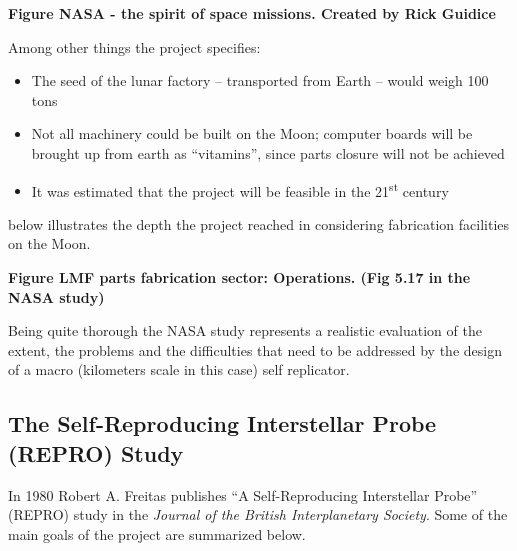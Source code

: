 \documentclass[letterpaper]{article}
\begin{document}
\bigskip

{\bfseries
\label{bkm:Ref330929827}Figure  NASA - the spirit of space missions.
Created by Rick Guidice}


\bigskip

Among other things the project specifies:


\bigskip

\begin{itemize}
\item The seed of the lunar factory – transported from Earth – would
weigh 100 tons
\item Not all machinery could be built on the Moon; computer boards will
be brought up from earth as “vitamins”, since parts closure will not be
achieved
\item It was estimated that the project will be feasible in the
21\textsuperscript{st} century
\end{itemize}
 below illustrates the depth the project reached in considering
fabrication facilities on the Moon.


\bigskip

{\bfseries
\label{bkm:Ref330932474}Figure  LMF parts fabrication sector:
Operations. (Fig 5.17 in the NASA study)}


\bigskip

Being quite thorough the NASA study represents a realistic evaluation of
the extent, the problems and the difficulties that need to be addressed
by the design of a macro (kilometers scale in this case) self
replicator.


\bigskip

\subsection[The Self{}-Reproducing Interstellar Probe (REPRO) Study]{The
Self-Reproducing Interstellar Probe (REPRO) Study}
\hypertarget{RefHeading3156306210128}{}In 1980 Robert A. Freitas
publishes  “A Self-Reproducing Interstellar Probe” (REPRO) study  in
the \textit{Journal of the British Interplanetary Society}. Some of the
main goals of the project are summarized below.


\bigskip
\end{document}
